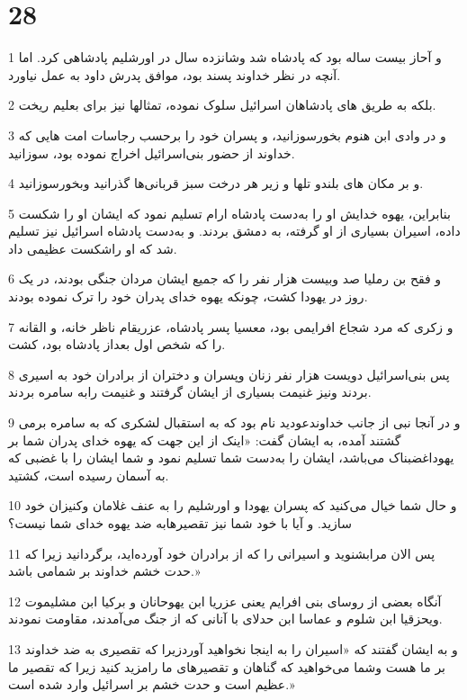 \chapter{28}

\par 1 و آحاز بیست ساله بود که پادشاه شد وشانزده سال در اورشلیم پادشاهی کرد. اما آنچه در نظر خداوند پسند بود، موافق پدرش داود به عمل نیاورد.
\par 2 بلکه به طریق های پادشاهان اسرائیل سلوک نموده، تمثالها نیز برای بعلیم ریخت.
\par 3 و در وادی ابن هنوم بخورسوزانید، و پسران خود را برحسب رجاسات امت هایی که خداوند از حضور بنی‌اسرائیل اخراج نموده بود، سوزانید.
\par 4 و بر مکان های بلندو تلها و زیر هر درخت سبز قربانی‌ها گذرانید وبخور‌سوزانید.
\par 5 بنابراین، یهوه خدایش او را به‌دست پادشاه ارام تسلیم نمود که ایشان او را شکست داده، اسیران بسیاری از او گرفته، به دمشق بردند. و به‌دست پادشاه اسرائیل نیز تسلیم شد که او راشکست عظیمی داد.
\par 6 و فقح بن رملیا صد وبیست هزار نفر را که جمیع ایشان مردان جنگی بودند، در یک روز در یهودا کشت، چونکه یهوه خدای پدران خود را ترک نموده بودند.
\par 7 و زکری که مرد شجاع افرایمی بود، معسیا پسر پادشاه، عزریقام ناظر خانه، و القانه را که شخص اول بعداز پادشاه بود، کشت.
\par 8 پس بنی‌اسرائیل دویست هزار نفر زنان وپسران و دختران از برادران خود به اسیری بردند ونیز غنیمت بسیاری از ایشان گرفتند و غنیمت رابه سامره بردند.
\par 9 و در آنجا نبی از جانب خداوندعودید نام بود که به استقبال لشکری که به سامره برمی گشتند آمده، به ایشان گفت: «اینک از این جهت که یهوه خدای پدران شما بر یهوداغضبناک می‌باشد، ایشان را به‌دست شما تسلیم نمود و شما ایشان را با غضبی که به آسمان رسیده است، کشتید.
\par 10 و حال شما خیال می‌کنید که پسران یهودا و اورشلیم را به عنف غلامان وکنیزان خود سازید. و آیا با خود شما نیز تقصیرهابه ضد یهوه خدای شما نیست؟
\par 11 پس الان مرابشنوید و اسیرانی را که از برادران خود آورده‌اید، برگردانید زیرا که حدت خشم خداوند بر شمامی باشد.»
\par 12 آنگاه بعضی از روسای بنی افرایم یعنی عزریا ابن یهوحانان و برکیا ابن مشلیموت ویحزقیا ابن شلوم و عماسا ابن حدلای با آنانی که از جنگ می‌آمدند، مقاومت نمودند.
\par 13 و به ایشان گفتند که «اسیران را به اینجا نخواهید آوردزیرا که تقصیری به ضد خداوند بر ما هست وشما می‌خواهید که گناهان و تقصیرهای ما رامزید کنید زیرا که تقصیر ما عظیم است و حدت خشم بر اسرائیل وارد شده است.»
